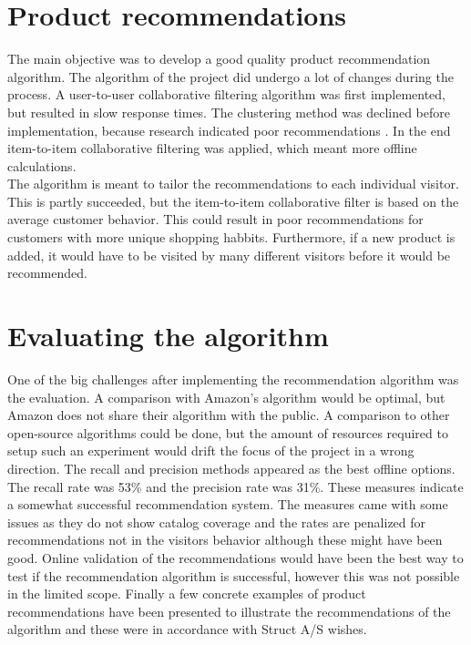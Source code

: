 \section{Product recommendations}
The main objective was to develop a good quality product recommendation algorithm. The algorithm of the project did undergo a lot of changes during the process. A user-to-user collaborative filtering algorithm was first implemented, but resulted in slow response times. The clustering method was declined before implementation, because research indicated poor recommendations \cite{AmazonRecommendations}. In the end item-to-item collaborative filtering was applied, which meant more offline calculations. \\
The algorithm is meant to tailor the recommendations to each individual visitor. This is partly succeeded, but the item-to-item collaborative filter is based on the average customer behavior. This could result in poor recommendations for customers with more unique shopping habbits. Furthermore, if a new product is added, it would have to be visited by many different visitors before it would be recommended.

\section{Evaluating the algorithm}
One of the big challenges after implementing the recommendation algorithm was the evaluation. A comparison with Amazon's algorithm would be optimal, but Amazon does not share their algorithm with the public. A comparison to other open-source algorithms could be done, but the amount of resources required to setup such an experiment would drift the focus of the project in a wrong direction. The recall and precision methods appeared as the best offline options. The recall rate was 53\% and the precision rate was 31\%. These measures indicate a somewhat successful recommendation system. The measures came with some issues as they do not show catalog coverage and the rates are penalized for recommendations not in the visitors behavior although these might have been good. Online validation of the recommendations would have been the best way to test if the recommendation algorithm is successful, however this was not possible in the limited scope. Finally a few concrete examples of product recommendations have been presented to illustrate the recommendations of the algorithm and these were in accordance with Struct A/S wishes. 